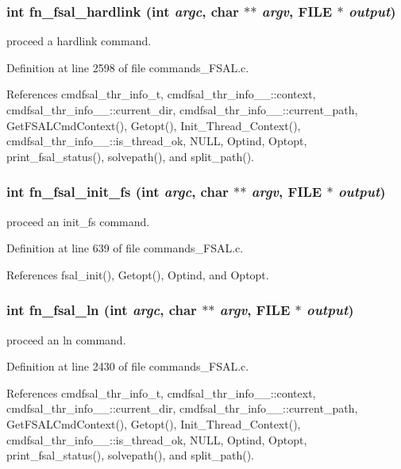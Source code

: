 \subsubsection{\setlength{\rightskip}{0pt plus 5cm}int fn\_\-fsal\_\-hardlink (int {\em argc}, char $\ast$$\ast$ {\em argv}, FILE $\ast$ {\em output})}\label{commands_8h_a17}


proceed a hardlink command. 

Definition at line 2598 of file commands\_\-FSAL.c.

References cmdfsal\_\-thr\_\-info\_\-t, cmdfsal\_\-thr\_\-info\_\-\_\-::context, cmdfsal\_\-thr\_\-info\_\-\_\-::current\_\-dir, cmdfsal\_\-thr\_\-info\_\-\_\-::current\_\-path, Get\-FSALCmd\-Context(), Getopt(), Init\_\-Thread\_\-Context(), cmdfsal\_\-thr\_\-info\_\-\_\-::is\_\-thread\_\-ok, NULL, Optind, Optopt, print\_\-fsal\_\-status(), solvepath(), and split\_\-path().
\subsubsection{\setlength{\rightskip}{0pt plus 5cm}int fn\_\-fsal\_\-init\_\-fs (int {\em argc}, char $\ast$$\ast$ {\em argv}, FILE $\ast$ {\em output})}\label{commands_8h_a6}


proceed an init\_\-fs command. 

Definition at line 639 of file commands\_\-FSAL.c.

References fsal\_\-init(), Getopt(), Optind, and Optopt.
\subsubsection{\setlength{\rightskip}{0pt plus 5cm}int fn\_\-fsal\_\-ln (int {\em argc}, char $\ast$$\ast$ {\em argv}, FILE $\ast$ {\em output})}\label{commands_8h_a16}


proceed an ln command. 

Definition at line 2430 of file commands\_\-FSAL.c.

References cmdfsal\_\-thr\_\-info\_\-t, cmdfsal\_\-thr\_\-info\_\-\_\-::context, cmdfsal\_\-thr\_\-info\_\-\_\-::current\_\-dir, cmdfsal\_\-thr\_\-info\_\-\_\-::current\_\-path, Get\-FSALCmd\-Context(), Getopt(), Init\_\-Thread\_\-Context(), cmdfsal\_\-thr\_\-info\_\-\_\-::is\_\-thread\_\-ok, NULL, Optind, Optopt, print\_\-fsal\_\-status(), solvepath(), and split\_\-path().
